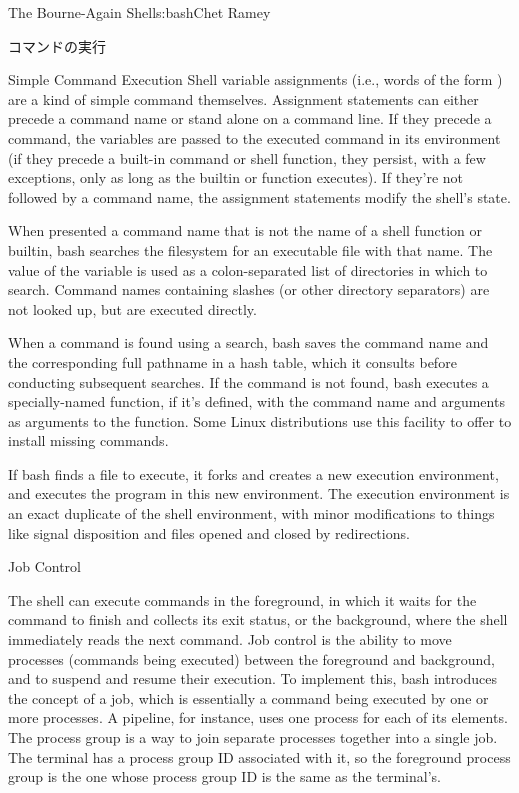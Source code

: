 \begin{aosachapter}{The Bourne-Again Shell}{s:bash}{Chet Ramey}
\begin{aosasect1}{コマンドの実行}
\begin{aosasect2}{Simple Command Execution}
Shell variable assignments (i.e., words of the form ) are a
kind of simple command themselves.  Assignment statements can either
precede a command name or stand alone on a command line.  If they
precede a command, the variables are passed to the executed command in
its environment (if they precede a built-in command or shell function,
they persist, with a few exceptions, only as long as the builtin or
function executes).  If they're not followed by a command name, the
assignment statements modify the shell's state.

When presented a command name that is not the name of a shell function
or builtin, bash searches the filesystem for an executable file with
that name.  The value of the  variable is used as a
colon-separated list of directories in which to search.  Command names
containing slashes (or other directory separators) are not looked up,
but are executed directly.

When a command is found using a  search, bash saves the
command name and the corresponding full pathname in a hash table,
which it consults before conducting subsequent  searches.
If the command is not found, bash executes a specially-named function,
if it's defined, with the command name and arguments as arguments to
the function.  Some Linux distributions use this facility to offer to
install missing commands.

If bash finds a file to execute, it forks and creates a new execution
environment, and executes the program in this new environment.  The
execution environment is an exact duplicate of the shell environment,
with minor modifications to things like signal disposition and files
opened and closed by redirections.

\end{aosasect2}

\begin{aosasect2}{Job Control}

The shell can execute commands in the foreground, in which it waits
for the command to finish and collects its exit status, or the
background, where the shell immediately reads the next command.  Job
control is the ability to move processes (commands being executed)
between the foreground and background, and to suspend and resume their
execution.  To implement this, bash introduces the concept of a job,
which is essentially a command being executed by one or more
processes. A pipeline, for instance, uses one process for each of its elements.
The process group is a way to join separate processes
together into a single job.  The terminal has a process group ID
associated with it, so the foreground process group is the one whose
process group ID is the same as the terminal's.


\end{aosasect2}
\end{aosasect1}
\end{aosachapter}
